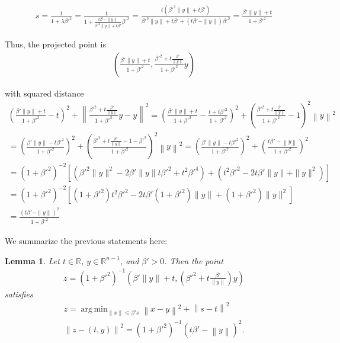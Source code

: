 \documentclass{article}
\newtheorem{lemma}[theorem]{Lemma}
\theoremstyle{case}
\numberwithin{theorem}{subsection}
\DeclareMathOperator*{\argmin}{arg\,min}
\newcommand{\reals}{\mathbb R}
\begin{document}
\begin{align*}
s = \frac {t}{1 + \lambda{\beta'}^2 } 
= \frac {t}{1 +\frac{t{\beta'} - \|y\|}{{\beta'}^2\|y\| + t{\beta'}}{\beta'}^2 } 
= \frac {t\left({\beta'}^2\|y\| + t{\beta'}\right)}{{\beta'}^2\|y\| + t{\beta'} + \left(t{\beta'} - \|y\|\right){\beta'}^2 } 
= \frac {{\beta'}\|y\| + t}{1 + {\beta'}^2 } 
\end{align*}


Thus, the projected point is
\begin{align*}
\left(\frac{{\beta'} \|y\| + t}{1 + {\beta'} ^ 2}, \frac{{\beta'} ^ 2 + t \frac {{\beta'}}{\|y\|}}{1 + {\beta'} ^ 2}y\right)
\end{align*}

with squared distance
\begin{align*}
\left(\frac{{\beta'} \|y\| + t}{1 + {\beta'} ^ 2} - t\right)^2 + \left\|\frac{{\beta'} ^ 2 + t \frac {{\beta'}}{\|y\|}}{1 + {\beta'} ^ 2}y - y\right\|^2
= \left(\frac{{\beta'} \|y\| + t}{1 + {\beta'} ^ 2} - \frac{t + t{\beta'} ^ 2}{1 + {\beta'} ^ 2}\right)^2 + \left(\frac{{\beta'} ^ 2 + t \frac {{\beta'}}{\|y\|}}{1 + {\beta'} ^ 2} - 1\right)^2\left\|y\right\|^2 \\
= \left(\frac{{\beta'} \|y\| - t{\beta'}^2}{1 + {\beta'} ^ 2}\right)^2 + \left(\frac{{\beta'} ^ 2 + t \frac {{\beta'}}{\|y\|} - 1 - {\beta'} ^ 2}{1 + {\beta'} ^ 2}\right)^2\left\|y\right\|^2 
= \left(\frac{{\beta'} \|y\| - t{\beta'}^2}{1 + {\beta'} ^ 2}\right)^2 + \left(\frac{t {\beta'} - \left\|y\right\|}{1 + {\beta'} ^ 2}\right)^2 \\
= \left(1 + {\beta'}^2\right)^{-2}\left[\left({\beta'}^2 \|y\|^2 - 2\beta' \|y\| t {\beta'}^2  + t^2 {\beta'}^4\right) + \left(t^2{\beta'}^2 - 2 t {\beta'} \|y\| + \|y\|^2\right) \right] \\
= \left(1 + {\beta'}^2\right)^{-2}\left[
\left(1 + {\beta'}^2\right)t^2{\beta'}^2 - 2t{\beta'}\left(1 + {\beta'}^2\right) \|y\| + \left(1 + {\beta'}^2\right)\|y\|^2
\right] \\
= \frac{\left(t \beta' - \|y\|\right)^2}{1 + {\beta'}^2}
\end{align*}

We summarize the previous statements here:


\begin{lemma}
Let $t \in \reals$, $y \in \mathbb R^{n-1}$, and $\beta' > 0$.
Then the point
\begin{align*}
z = \left(1 + {\beta'} ^ 2\right)^{-1} \left({\beta'} \|y\| + t, \left({\beta'} ^ 2 + t \frac {{\beta'}}{\|y\|}\right) y\right)
\end{align*}
satisfies
\begin{align*}
z = \argmin_{\left\|x\right\| \le \beta' s} \left\|x - y\right\|^2 + \left\|s - t\right\|^2 \\
\left\|z - (t, y)\right\|^2 = \left(1 + {\beta'}^2\right)^{-1}\left(t \beta' - \left\|y\right\| \right)^2.
\end{align*}
\end{lemma}
\end{document}
